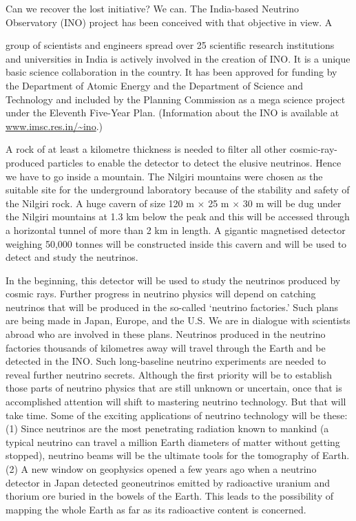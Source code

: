 Can we recover the lost initiative?  We can. The India-based Neutrino Observatory (INO) project has been conceived with that objective in view. A

group of scientists and engineers spread over 25 scientific research institutions and universities in India is actively involved in the creation of INO. It is a unique basic science collaboration in the country. It has been approved for funding by the Department of Atomic Energy and the Department of Science and Technology and included by the Planning Commission as a mega science project under the Eleventh Five-Year Plan.  (Information about the INO is available at \url{www.imsc.res.in/~ino}.)

A rock of at least a kilometre thickness is needed to filter all other cosmic-ray-produced particles to enable the detector to detect the elusive neutrinos. Hence we have to go inside a mountain. The Nilgiri mountains were chosen as the suitable site for the underground laboratory because of the stability and safety of the Nilgiri rock. A huge cavern of size 120 m $\times$ 25 m $\times$ 30 m will be dug under the Nilgiri mountains at 1.3 km below the peak and this will be accessed through a horizontal tunnel of more than 2 km in length. A gigantic magnetised detector weighing 50,000 tonnes will be constructed inside this cavern and will be used to detect and study the neutrinos. 

In the beginning, this detector will be used to study the neutrinos produced by cosmic rays. Further progress in neutrino physics will depend on catching neutrinos that will be produced in the so-called ‘neutrino factories.’ Such plans are being made in Japan, Europe, and the U.S. We are in dialogue with scientists abroad who are involved in these plans. Neutrinos produced in the neutrino factories thousands of kilometres away will travel through the Earth and be detected in the INO. Such long-baseline neutrino experiments are needed to reveal further neutrino secrets.
Although the first priority will be to establish those parts of neutrino physics that are still unknown or uncertain, once that is accomplished attention will shift to mastering neutrino technology. But that will take time. Some of the exciting applications of neutrino technology will be these:  (1) Since neutrinos are the most penetrating radiation known to mankind (a typical neutrino can travel a million Earth diameters of matter without getting stopped), neutrino beams will be the ultimate tools for the tomography of Earth. (2) A new window on geophysics opened a few years ago when a neutrino detector in Japan detected geoneutrinos emitted by radioactive uranium and thorium ore buried in the bowels of the Earth. This leads to the possibility of mapping the whole Earth as far as its radioactive content is concerned.

